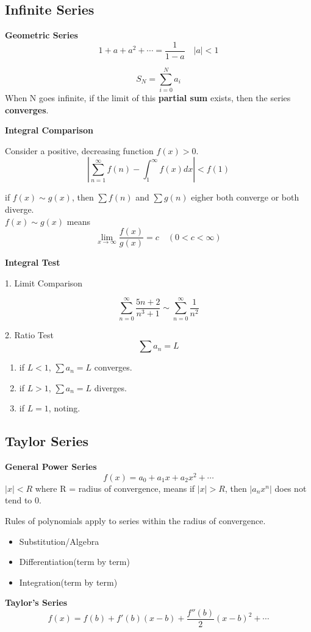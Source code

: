 \documentclass{article}
\newcommand\limitx[1]{\lim_{x \to #1}}
\newcommand\improperint[1]{\int_{#1}^\infty}
\begin{document}
\subsection{Infinite Series}

\textbf{Geometric Series}
$$1 + a + a^2 + \cdots = \frac{1}{1-a} \quad |a| < 1$$

$$S_N = \sum\limits_{i=0}^{N}a_i$$
When N goes infinite, if the limit of this \textbf{partial sum} exists, then the series \textbf{converges}.

\textbf{Integral Comparison}

Consider a positive, decreasing function $f(x) > 0$.
$$|\sum\limits_{n=1}^{\infty}f(n) - \improperint{1}f(x)dx| < f(1)$$

if $f(x) \sim g(x)$, then $\sum f(n)$ and $\sum g(n)$ eigher both converge or both diverge. \\
$f(x) \sim g(x)$ means
$$\limitx{\infty}\frac{f(x)}{g(x)} = c \quad (0 < c < \infty)$$

\textbf{Integral Test}

1. Limit Comparison

$$\sum\limits_{n=0}^{\infty}\frac{5n+2}{n^3+1} \sim \sum\limits_{n=0}^{\infty}\frac{1}{n^2}$$

2. Ratio Test
$$\sum a_n = L$$
\begin{enumerate}
  \item if $L < 1$, $\sum a_n = L$ converges.
  \item if $L >1 $, $\sum a_n = L$ diverges.
  \item if $L = 1$, noting.
\end{enumerate}


\subsection{Taylor Series}

\textbf{General Power Series}
$$f(x) = a_0 + a_1x + a_2x^2 + \cdots$$
$|x| < R$ where R = radius of convergence, means if $|x| > R$, then $|a_nx^n|$ does not tend to 0.

Rules of polynomials apply to series within the radius of convergence.
\begin{itemize}
  \item Substitution/Algebra
  \item Differentiation(term by term)
  \item Integration(term by term)
\end{itemize}

\textbf{Taylor's Series}
$$f(x) = f(b) + f'(b)(x-b) + \frac{f''(b)}{2}(x-b)^2 + \cdots $$
\end{document}
